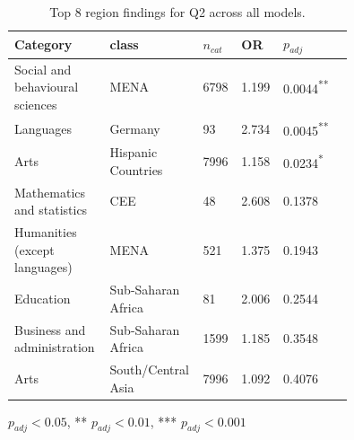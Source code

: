 \begin{table}[t]
\centering
\small
\caption{Top 8 region findings for Q2 across all models.}
\label{tab:summary-q2-region}
\begin{tabular}{p{0.26\linewidth}p{0.14\linewidth}p{0.07\linewidth}p{0.08\linewidth}p{0.20\linewidth}}
\setlength{\tabcolsep}{3pt}
\toprule
\textbf{Category} & \textbf{class} & \textbf{$n_{cat}$} & \textbf{OR} & \textbf{$p_{adj}$} \\
\midrule
Social and behavioural sciences & MENA & 6798 & 1.199 & 0.0044\textsuperscript{**} \\
\midrule
Languages & Germany & 93 & 2.734 & 0.0045\textsuperscript{**} \\
\midrule
Arts & Hispanic Countries & 7996 & 1.158 & 0.0234\textsuperscript{*} \\
\midrule
Mathematics and statistics & CEE & 48 & 2.608 & 0.1378 \\
\midrule
Humanities (except languages) & MENA & 521 & 1.375 & 0.1943 \\
\midrule
Education & Sub-Saharan Africa & 81 & 2.006 & 0.2544 \\
\midrule
Business and administration & Sub-Saharan Africa & 1599 & 1.185 & 0.3548 \\
\midrule
Arts & South/Central Asia & 7996 & 1.092 & 0.4076 \\
\bottomrule
\end{tabular}
\par\smallskip
{\footnotesize * $p_{adj} < 0.05$, ** $p_{adj} < 0.01$, *** $p_{adj} < 0.001$}
\end{table}
